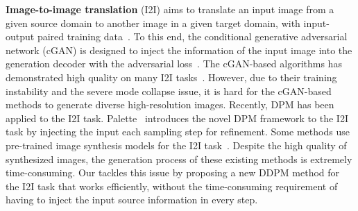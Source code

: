\noindent\textbf{Image-to-image translation} (I2I) aims to translate an input image from a given source domain to another image in a given target domain, with input-output paired training data~\cite{isola2017image}.
%
To this end, the conditional generative adversarial network (cGAN) is designed to inject the information of the input image into the generation decoder with the adversarial loss~\cite{mirza2014conditional,goodfellow2014generative}.
%
The cGAN-based algorithms has demonstrated high quality on many I2I tasks~\cite{dong2017semantic,kaneko2017generative,karacan2016learning,ledig2017photo,sangkloy2017scribbler,wang2016generative,zhang2017age,jiang2020tsit,park2019SPADE,Zhu_2020_CVPR}.
%
However, due to their training instability and the severe mode collapse issue, it is hard for the cGAN-based methods to generate diverse high-resolution images.
%
Recently, DPM has been applied to the I2I task.
%
Palette~\cite{saharia2021palette} introduces the novel DPM framework to the I2I task by injecting the input  each sampling step for refinement.
%
Some methods use pre-trained image synthesis models for the I2I task~\cite{wang2022pretraining}.
%
Despite the high quality of synthesized images, the generation process of these existing methods is extremely time-consuming. 
%
Our  tackles this issue by proposing a new DDPM method for the I2I task that works efficiently, without the time-consuming requirement of having to inject the input source information in every  step. 
%

